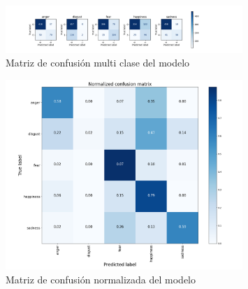 \begin{figure}
    \centering
    \includegraphics[width=0.8\textwidth]{cap2/images/multilabel_confusion_matrix.png}
    \caption{Matriz de confusión multi clase del modelo}
    \label{fig:confusion-matrix-multilabel}
\end{figure}


\begin{figure}
    \centering
    \includegraphics[width=0.8\textwidth]{cap2/images/normalized_confusion_matrix.png}
    \caption{Matriz de confusión normalizada del modelo}
    \label{fig:confusion-matrix-normalized}
\end{figure}




\endinput